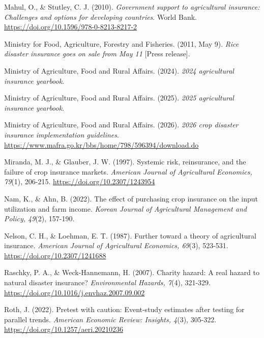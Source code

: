 \begin{thebibliography}{}
Mahul, O., \& Stutley, C. J. (2010). \textit{Government support to agricultural insurance: Challenges and options for developing countries}. World Bank. \url{https://doi.org/10.1596/978-0-8213-8217-2}

Ministry for Food, Agriculture, Forestry and Fisheries. (2011, May 9). \textit{Rice disaster insurance goes on sale from May 11} [Press release].

Ministry of Agriculture, Food and Rural Affairs. (2024). \textit{2024 agricultural insurance yearbook}.

Ministry of Agriculture, Food and Rural Affairs. (2025). \textit{2025 agricultural insurance yearbook}.

Ministry of Agriculture, Food and Rural Affairs. (2026). \textit{2026 crop disaster insurance implementation guidelines}. \url{https://www.mafra.go.kr/bbs/home/798/596394/download.do}

Miranda, M. J., \& Glauber, J. W. (1997). Systemic risk, reinsurance, and the failure of crop insurance markets. \textit{American Journal of Agricultural Economics, 79}(1), 206-215. \url{https://doi.org/10.2307/1243954}

Nam, K., \& Ahn, B. (2022). The effect of purchasing crop insurance on the input utilization and farm income. \textit{Korean Journal of Agricultural Management and Policy, 49}(2), 157-190.

Nelson, C. H., \& Loehman, E. T. (1987). Further toward a theory of agricultural insurance. \textit{American Journal of Agricultural Economics, 69}(3), 523-531. \url{https://doi.org/10.2307/1241688}

Raschky, P. A., \& Weck-Hannemann, H. (2007). Charity hazard: A real hazard to natural disaster insurance? \textit{Environmental Hazards, 7}(4), 321-329. \url{https://doi.org/10.1016/j.envhaz.2007.09.002}

Roth, J. (2022). Pretest with caution: Event-study estimates after testing for parallel trends. \textit{American Economic Review: Insights, 4}(3), 305-322. \url{https://doi.org/10.1257/aeri.20210236}


\end{thebibliography}
